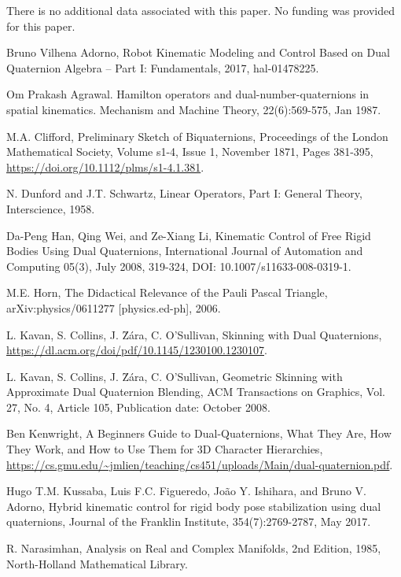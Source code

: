 \documentclass[12pt,reqno]{amsart}
\begin{document}
There is no additional data associated with this paper.  No funding was provided for this paper.

\begin{thebibliography}{99}

 Bruno Vilhena Adorno, Robot Kinematic Modeling and Control Based on Dual Quaternion Algebra -- Part I: Fundamentals, 2017, hal-01478225.

 Om Prakash Agrawal. Hamilton operators and dual-number-quaternions in spatial kinematics. Mechanism and Machine Theory, 22(6):569-575, Jan 1987.

 M.A. Clifford, Preliminary Sketch of Biquaternions, Proceedings of the London Mathematical Society, Volume s1-4, Issue 1, November 1871, Pages 381-395, \url{https://doi.org/10.1112/plms/s1-4.1.381}.

 N. Dunford and J.T. Schwartz, Linear Operators, Part I: General Theory, Interscience, 1958.

 Da-Peng Han, Qing Wei, and Ze-Xiang Li, Kinematic Control of Free Rigid Bodies Using Dual Quaternions, International Journal of Automation and Computing
05(3), July 2008, 319-324, DOI: 10.1007/s11633-008-0319-1.

 M.E. Horn, The Didactical Relevance of the Pauli Pascal Triangle, arXiv:physics/0611277 [physics.ed-ph], 2006.

 L. Kavan, S. Collins, J. \u Z\'ara, C. O'Sullivan, Skinning with Dual Quaternions, \url{https://dl.acm.org/doi/pdf/10.1145/1230100.1230107}.

 L. Kavan, S. Collins, J. \u Z\'ara, C. O'Sullivan, Geometric Skinning with Approximate Dual Quaternion Blending, ACM Transactions on Graphics, Vol. 27, No. 4, Article 105, Publication date: October 2008.

 Ben Kenwright, A Beginners Guide to Dual-Quaternions, What They Are, How They Work, and How to Use Them for 3D Character Hierarchies, \url{https://cs.gmu.edu/~jmlien/teaching/cs451/uploads/Main/dual-quaternion.pdf}.

 Hugo T.M. Kussaba, Luis F.C. Figueredo, Jo\~ao Y. Ishihara, and Bruno V. Adorno, Hybrid kinematic control for rigid body pose stabilization using dual quaternions, Journal of the Franklin Institute, 354(7):2769-2787, May 2017.

 R. Narasimhan, Analysis on Real and Complex Manifolds, 2nd Edition, 1985, North-Holland Mathematical Library.


\end{thebibliography}
\end{document}
